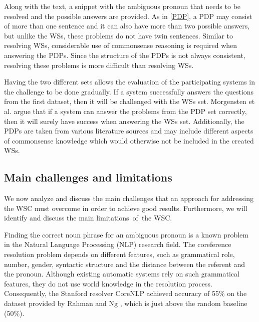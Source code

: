 Along with the text, a snippet with the ambiguous pronoun that needs to be resolved and the possible answers are provided. As in \ref{PDP}, a PDP may consist of more than one sentence and it can also have more than two possible answers, but unlike the WSs, these problems do not have twin sentences. Similar to resolving WSs, considerable use of commonsense reasoning is required when answering the PDPs. Since the structure of the PDPs is not always consistent, resolving these problems is more difficult than resolving WSs.

Having the two different sets allows the evaluation of the participating systems in the challenge to be done gradually. 
If a system successfully answers the questions from the first dataset, then it will be challenged with the WSs set. Morgensten et al. \cite{DBLP:journals/aim/MorgensternDO16} argue that if a system can answer the problems from the PDP set correctly, then it will surely have success when answering the WSs set.  
Additionally, the PDPs are taken from various literature sources and may include different aspects of commonsense knowledge which would otherwise not be included in the created WSs. 

\begin{comment}
Since the idea of the authors of the WSC was to construct this challenge as an alternative to the Turing test, it can be observed that indeed it captures the main characteristics of a Turing test: 

\begin{itemize}
	\item it requires the subject to respond on a non-domain specific set of English sentences
	\item it is easy to solve by native English speakers
	\item to pass successfully the test, the subject has to think
\end{itemize}
\end{comment}


\subsection{Main challenges and limitations}
We now analyze and discuss the main challenges that an approach for addressing the WSC must overcome in order to achieve good results. Furthermore, we will identify and discuss the main limitations~of~the WSC. 

Finding the correct noun phrase for an ambiguous pronoun is a known problem in the Natural Language Processing (NLP) research field. The coreference resolution problem depends on different features, such as grammatical role, number, gender, syntactic structure and the distance between the referent and the pronoun. Although existing automatic systems rely on such grammatical features, they do not use world knowledge in the resolution process. Consequently, the Stanford resolver CoreNLP \cite{lee11conllst}  achieved accuracy of 55\% on the dataset provided by Rahman and Ng \cite{DBLP:conf/emnlp/RahmanN12}, which is just above the random baseline (50\%).
	
